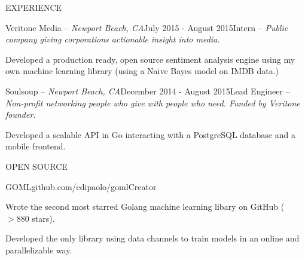 \documentclass{resume} %
\begin{document}
\begin{rSection}{EXPERIENCE}
\begin{rSubsection}{Veritone Media -- {\it Newport Beach, CA}}{July 2015 - August 2015}{Intern -- {\sl Public company giving corporations actionable insight into media.}}
\item Developed a production ready, open source sentiment analysis engine using my own machine learning library (using a Naive Bayes model on IMDB data.)
\end{rSubsection}

\begin{rSubsection}{Soulsoup -- {\it Newport Beach, CA}}{December 2014 - August 2015}{Lead Engineer -- {\sl Non-profit networking people who give with people who need. Funded by Veritone founder.}}

\item Developed a scalable API in Go interacting with a PostgreSQL database and a
    mobile frontend.
\end{rSubsection} 

\end{rSection}


\begin{rSection}{OPEN SOURCE}

\begin{rSubsection}{GOML}{\textsf{github.com/cdipaolo/goml}}{Creator}

\item Wrote the second most starred Golang machine learning libary on GitHub ($>880$ stars).
\item Developed the only library using data channels to train models in an online and parallelizable way.
\end{rSubsection}

\end{rSection}

\end{document}
